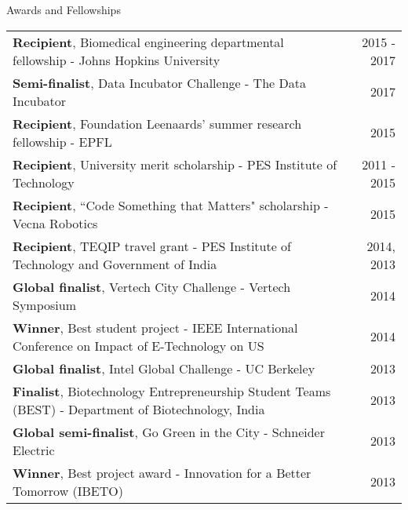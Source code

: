 \documentclass{resume}
\begin{document}
        \begin{rSection}{Awards and Fellowships}
\begin{tabular*}{\textwidth}{@{\extracolsep{\fill}}lr@{}}
\textbf{Recipient}, Biomedical engineering departmental fellowship - Johns Hopkins University & 2015 - 2017\\ 
\textbf{Semi-finalist}, Data Incubator Challenge - The Data Incubator & 2017\\
\textbf{Recipient}, Foundation Leenaards' summer research fellowship - EPFL &  2015\\
\textbf{Recipient}, University merit scholarship - PES Institute of Technology & 2011 - 2015 \\ 
\textbf{Recipient}, ``Code Something that Matters" scholarship - Vecna Robotics & 2015\\
\textbf{Recipient}, TEQIP travel grant - PES Institute of Technology and Government of India& 2014, 2013 \\ 
\textbf{Global finalist}, Vertech City Challenge - Vertech Symposium  & 2014\\
\textbf{Winner}, Best student project - IEEE International Conference on Impact of E-Technology on US & 2014\\
\textbf{Global finalist}, Intel Global Challenge -  UC Berkeley & 2013 \\
\textbf{Finalist}, Biotechnology Entrepreneurship Student Teams (BEST) - Department of Biotechnology, India & 2013\\
\textbf{Global semi-finalist}, Go Green in the City - Schneider Electric & 2013 \\
\textbf{Winner}, Best project award - Innovation for a Better Tomorrow (IBETO)  & 2013\\
\end{tabular*}
    \end{rSection}

  \vspace{1em}
\end{document}
